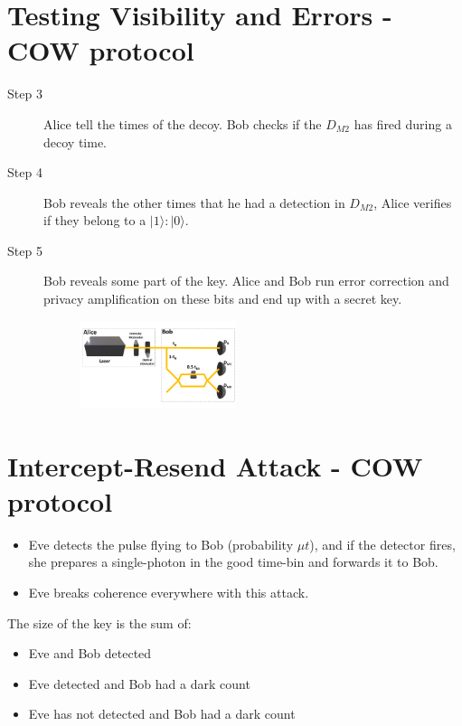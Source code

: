 \documentclass[1000pt]{article}
\newcommand{\mysection}[1]{\section*{\color{black}\sffamily #1}}%
\begin{document}
\mysection{\Huge\textbf{Testing Visibility and Errors - COW protocol}} \Large \vspace*{1cm}
\begin{description}

\item [Step 3] Alice tell the times of the decoy. Bob checks if the $D_{M2}$ has fired during a decoy time.

\item [Step 4] Bob reveals the other times that he had a detection in $D_{M2}$, Alice verifies if they belong to a $|1\rangle:|0\rangle$.

\item [Step 5] Bob reveals some part of the key. Alice and Bob run error correction and privacy amplification on these bits and end up with a secret key.

\begin{figure}[hbt]
    	\centering
    	\includegraphics[width=0.45\textwidth]{./figures/Full2.pdf}
    \end{figure}
\end{description}


\mysection{\Huge\textbf{Intercept-Resend Attack - COW protocol}} \Large \vspace*{1cm}
\begin{itemize}
	\item Eve detects the pulse flying to Bob (probability $\mu t$), and if the detector fires, she prepares a single-photon in the good time-bin and forwards it to Bob.
	\item Eve breaks coherence everywhere with this attack.
\end{itemize}
The size of the key is the sum of:
\begin{itemize}	
	\item Eve and Bob detected
	\item Eve detected and Bob had a dark count
	\item Eve has not detected and Bob had a dark count
\end{itemize}
	
\end{document}
